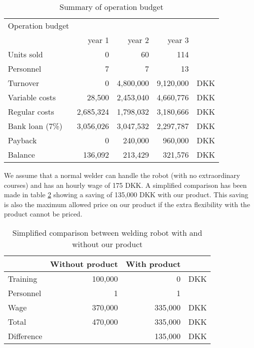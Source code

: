 \begin{table}[h!]
\centering
\begin{tabular}{l r r r r}
Operation budget      &            &              &             &    \\
                      & year 1     & year 2       & year 3      &    \\
\hline                                                               
Units sold            &          0 &        60   &         114  &    \\
Personnel             &          7 &         7   &          13  &    \\ 
\hline                                              
Turnover              &          0 & 4,800,000   &   9,120,000  & DKK\\
Variable costs        &     28,500 & 2,453,040   &   4,660,776  & DKK\\
Regular costs         &  2,685,324 & 1,798,032   &   3,180,666  & DKK\\
Bank loan (7\%)       &  3,056,026 & 3,047,532   &   2,297,787  & DKK\\
Payback               &          0 &   240,000   &     960,000  & DKK\\
Balance               &    136,092 &   213,429   &     321,576  & DKK\\  
\end{tabular}
\caption{Summary of operation budget}
\label{opebud}
\end{table}

We assume that a normal welder can handle the robot (with no extraordinary courses) and has an hourly wage of 175 DKK.
A simplified comparison has been made in table \ref{weld-example} showing a saving of 135,000 DKK with our product.
This saving is also the maximum allowed price on our product if the extra flexibility with the product cannot be priced.

\begin{table}[h!]
\centering
\begin{tabular}{l r r r}
			 	& Without product	& With product	&	\\
\hline
Training		& 		100,000	 	& 0				&  DKK\\
Personnel		&		1			&	1			&    \\
Wage			&		370,000		&   335,000		& DKK	 \\
Total			&		470,000		& 335,000		& DKK\\
\hline
Difference		&					& 135,000		& DKK\\
\end{tabular}
\caption{Simplified comparison between welding robot with and without our product }
\label{weld-example}
\end{table}

